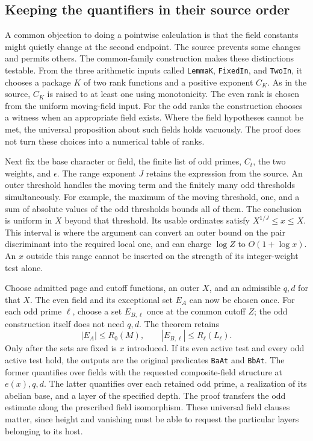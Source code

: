 \documentclass[12pt,letterpaper]{article}
\begin{document}
\subsection{Keeping the quantifiers in their source order}

A common objection to doing a pointwise calculation is that the field constants might quietly change at the second endpoint. The source prevents some changes and permits others. The common-family construction makes these distinctions testable. From the three arithmetic inputs called \texttt{LemmaK}, \texttt{FixedIn}, and \texttt{TwoIn}, it chooses a package $K$ of two rank functions and a positive exponent $C_K$. As in the source, $C_K$ is raised to at least one using monotonicity. The even rank is chosen from the uniform moving-field input. For the odd ranks the construction chooses a witness when an appropriate field exists. Where the field hypotheses cannot be met, the universal proposition about such fields holds vacuously. The proof does not turn these choices into a numerical table of ranks.

Next fix the base character or field, the finite list of odd primes, $C_t$, the two weights, and $\epsilon$. The range exponent $J$ retains the expression from the source. An outer threshold handles the moving term and the finitely many odd thresholds simultaneously. For example, the maximum of the moving threshold, one, and a sum of absolute values of the odd thresholds bounds all of them. The conclusion is uniform in $X$ beyond that threshold. Its usable ordinates satisfy $X^{1/J}\leq x\leq X$. This interval is where the argument can convert an outer bound on the pair discriminant into the required local one, and can charge $\log Z$ to $O(1+\log x)$. An $x$ outside this range cannot be inserted on the strength of its integer-weight test alone.

Choose admitted page and cutoff functions, an outer $X$, and an admissible $q,d$ for that $X$. The even field and its exceptional set $E_A$ can now be chosen once. For each odd prime $\ell$, choose a set $E_{B,\ell}$ once at the common cutoff $Z$; the odd construction itself does not need $q,d$. The theorem retains
\[
    |E_A|\leq R_0(M),\qquad
    |E_{B,\ell}|\leq R_\ell(L_\ell).
\]
Only after the sets are fixed is $x$ introduced. If its even active test and every odd active test hold, the outputs are the original predicates \texttt{BaAt} and \texttt{BbAt}. The former quantifies over fields with the requested composite-field structure at $e(x),q,d$. The latter quantifies over each retained odd prime, a realization of its abelian base, and a layer of the specified depth. The proof transfers the odd estimate along the prescribed field isomorphism. These universal field clauses matter, since height and vanishing must be able to request the particular layers belonging to its host.
\end{document}
